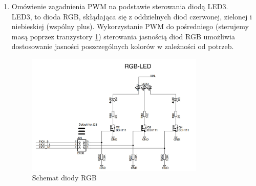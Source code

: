\begin{enumerate}
    \item Omówienie zagadnienia PWM na podstawie sterowania diodą LED3. \\
        LED3, to dioda RGB, skłądająca się z oddzielnych diod czerwonej, zielonej i niebieskiej (wspólny plus). Wykorzystanie PWM do pośredniego (sterujemy masą poprzez tranzystory \ref{fig:led3}) sterowania jasnością diod RGB umożliwia dostosowanie jasności poszczególnych kolorów w zależności od potrzeb.
        \begin{figure}[H]
            \centering
            \includegraphics[width=0.8\textwidth]{../PWM/led3.jpg}
            \caption{Schemat diody RGB}
            \label{fig:led3}
        \end{figure}
        

\end{enumerate}
